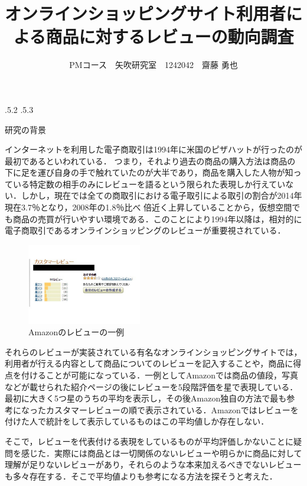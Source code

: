 \documentclass[uplatex]{jsarticle}
\title{\vspace{-14mm}オンラインショッピングサイト利用者による商品に対するレビューの動向調査}
\author{PMコース　矢吹研究室　1242042　齋藤 勇也}
\date{}%
\makeatletter
\renewcommand{\section}{%
    \if@slide\clearpage\fi
    \@startsection{section}{1}{\z@}%
    {\Cvs \@plus.5\Cdp \@minus.2\Cdp}%
    {.5\Cvs \@plus.3\Cdp}%
    {\normalfont\raggedright}}
\makeatother
\begin{document}
\maketitle





\section{研究の背景}

インターネットを利用した電子商取引は1994年に米国のピザハットが行ったのが最初であるといわれている．\cite{sugasaka2003}
つまり，それより過去の商品の購入方法は商品の下に足を運び自身の手で触れていたのが大半であり，商品を購入した人物が知っている特定数の相手のみにレビューを語るという限られた表現しか行えていない．しかし，現在では全ての商取引における電子取引による取引の割合が2014年現在3.7％となり，2008年の1.8％比べ 倍近く上昇していることから，仮想空間でも商品の売買が行いやすい環境である．\cite{keizai2014}このことにより1994年以降は，相対的に電子商取引であるオンラインショッピングのレビューが重要視されている．

\begin{figure}
\vspace*{-\intextsep}
\includegraphics[width=5cm,clip]{customerReview.pdf}
\caption{Amazonのレビューの一例}\label{サンプル図}
\end{figure}

それらのレビューが実装されている有名なオンラインショッピングサイトでは，利用者が行える内容として商品についてのレビューを記入することや，商品に得点を付けることが可能になっている．一例としてAmazonでは商品の値段，写真などが載せられた紹介ページの後にレビューを5段階評価を星で表現している．最初に大きく5つ星のうちの平均を表示し，その後Amazon独自の方法で最も参考になったカスタマーレビューの順で表示されている．Amazonではレビューを付けた人で統計をして表示しているものはこの平均値しか存在しない．

そこで，レビューを代表付ける表現をしているものが平均評価しかないことに疑問を感じた．実際には商品とは一切関係のないレビューや明らかに商品に対して理解が足りないレビューがあり，それらのような本来加えるべきでないレビューも多々存在する．そこで平均値よりも参考になる方法を探そうと考えた．
\end{document}
